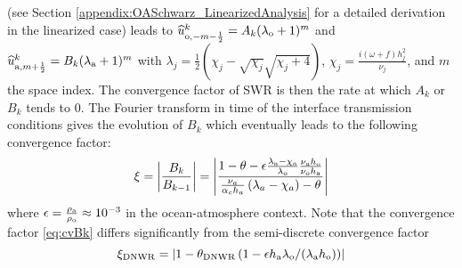 (see Section \ref{appendix:OASchwarz_LinearizedAnalysis}
for a detailed derivation in the linearized case) leads to 
$\widehat{u}_{{\rm o}, -m - \frac{1}{2}}^k = A_k (\lambda_{\rm o}+1)^m$
and
$\widehat{u}_{{\rm a}, m + \frac{1}{2}}^k = B_k (\lambda_{\rm a}+1)^m$ 
with $\lambda_j = \frac{1}{2}\left(\chi_j - \sqrt{\chi_j} \sqrt{\chi_j + 4}\right)$,
$\chi_j=\frac{i (\omega+f) h_j^2}{\nu_j}$,
and $m$ the space index. The convergence factor of SWR is then
the rate at which $A_k$ or $B_k$ tends to 0.
The Fourier transform in time of the interface
transmission conditions gives
the evolution of $B_k$ which eventually leads to 
the following convergence factor: 
\begin{equation} \label{eq:cvBk}
\xi = \left|\frac{B_k}{B_{k-1}}\right| = 
\left|
	\frac{1 - \theta - \epsilon \frac{\lambda_{\rm a} - \chi_{\rm a}}
		{\lambda_{\rm o}} \frac{\nu_{\rm a} h_{\rm o}}
			{\nu_{\rm o} h_{\rm a}}}
	{\frac{\nu_a}{\alpha_c h_a}
	\left(\lambda_a - \chi_a \right)
	- \theta}
\right|
\end{equation}
where $\epsilon = \frac{\rho_{\rm a}}{\rho_{\rm o}} \approx 10^{-3}$
in the ocean-atmosphere  context.
Note that the convergence factor \eqref{eq:cvBk} differs significantly from the semi-discrete convergence factor 
\begin{equation}
\xi_{\rm DNWR} = \left|1 - \theta_{\rm DNWR} \left(
1 - \epsilon h_{\rm a} \lambda_{\rm o} / (\lambda_{\rm a}h_{\rm o})\right) \right|
\end{equation}
